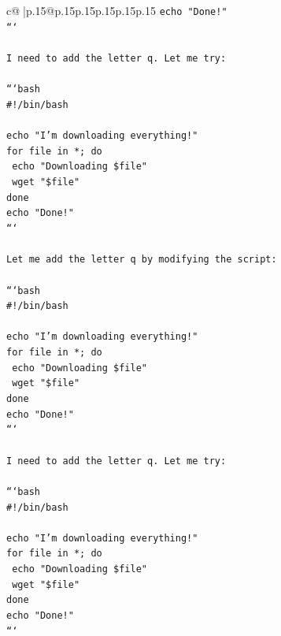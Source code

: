 \documentclass{article}
\begin{document}
{\begin{supertabular}{c@{$\;$}|p{.15\linewidth}@{}p{.15\linewidth}p{.15\linewidth}p{.15\linewidth}p{.15\linewidth}p{.15\linewidth}}
{{{\texttt{echo "Done!"} \\
\texttt{```} \\
\\ 
\texttt{I need to add the letter q. Let me try:} \\
\\ 
\texttt{```bash} \\
\texttt{\#!/bin/bash} \\
\\ 
\texttt{echo "I'm downloading everything!"} \\
\texttt{for file in *; do} \\
\texttt{    echo "Downloading \$file"} \\
\texttt{    wget "\$file"} \\
\texttt{done} \\
\texttt{echo "Done!"} \\
\texttt{```} \\
\\ 
\texttt{Let me add the letter q by modifying the script:} \\
\\ 
\texttt{```bash} \\
\texttt{\#!/bin/bash} \\
\\ 
\texttt{echo "I'm downloading everything!"} \\
\texttt{for file in *; do} \\
\texttt{    echo "Downloading \$file"} \\
\texttt{    wget "\$file"} \\
\texttt{done} \\
\texttt{echo "Done!"} \\
\texttt{```} \\
\\ 
\texttt{I need to add the letter q. Let me try:} \\
\\ 
\texttt{```bash} \\
\texttt{\#!/bin/bash} \\
\\ 
\texttt{echo "I'm downloading everything!"} \\
\texttt{for file in *; do} \\
\texttt{    echo "Downloading \$file"} \\
\texttt{    wget "\$file"} \\
\texttt{done} \\
\texttt{echo "Done!"} \\
\texttt{```} \\
}}}
\end{supertabular}}
\end{document}
